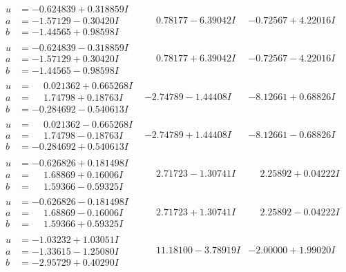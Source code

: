 \documentclass[1p]{elsarticle_modified}
\theoremstyle{definition}
\begin{document}
$$\begin{array}{c|c|c}
\begin{aligned}
u &= -0.624839 + 0.318859 I \\
a &= -1.57129 - 0.30420 I \\
b &= -1.44565 + 0.98598 I\end{aligned}
 & \phantom{-}0.78177 - 6.39042 I & -0.72567 + 4.22016 I \\ \hline\begin{aligned}
u &= -0.624839 - 0.318859 I \\
a &= -1.57129 + 0.30420 I \\
b &= -1.44565 - 0.98598 I\end{aligned}
 & \phantom{-}0.78177 + 6.39042 I & -0.72567 - 4.22016 I \\ \hline\begin{aligned}
u &= \phantom{-}0.021362 + 0.665268 I \\
a &= \phantom{-}1.74798 + 0.18763 I \\
b &= -0.284692 - 0.540613 I\end{aligned}
 & -2.74789 - 1.44408 I & -8.12661 + 0.68826 I \\ \hline\begin{aligned}
u &= \phantom{-}0.021362 - 0.665268 I \\
a &= \phantom{-}1.74798 - 0.18763 I \\
b &= -0.284692 + 0.540613 I\end{aligned}
 & -2.74789 + 1.44408 I & -8.12661 - 0.68826 I \\ \hline\begin{aligned}
u &= -0.626826 + 0.181498 I \\
a &= \phantom{-}1.68869 + 0.16006 I \\
b &= \phantom{-}1.59366 - 0.59325 I\end{aligned}
 & \phantom{-}2.71723 - 1.30741 I & \phantom{-}2.25892 + 0.04222 I \\ \hline\begin{aligned}
u &= -0.626826 - 0.181498 I \\
a &= \phantom{-}1.68869 - 0.16006 I \\
b &= \phantom{-}1.59366 + 0.59325 I\end{aligned}
 & \phantom{-}2.71723 + 1.30741 I & \phantom{-}2.25892 - 0.04222 I \\ \hline\begin{aligned}
u &= -1.03232 + 1.03051 I \\
a &= -1.33615 - 1.25080 I \\
b &= -2.95729 + 0.40290 I\end{aligned}
 & \phantom{-}11.18100 - 3.78919 I & -2.00000 + 1.99020 I \\ \hline\begin{aligned}

\end{aligned}
\end{array}$$
\end{document}
